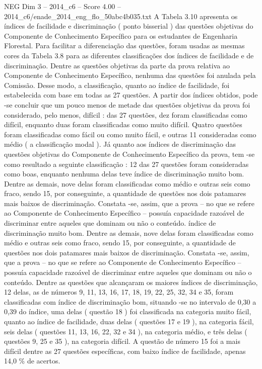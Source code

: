 \begin{textsample}{NEG Dim 3 – 2014\_c6 – Score 4.00 – 2014\_c6/enade\_2014\_eng\_flo\_50abc4b035.txt}
A Tabela 3.10 apresenta os índices de facilidade e discriminação ( ponto bisserial ) das questões objetivas do Componente de Conhecimento Específico para os estudantes de Engenharia Florestal.
Para facilitar a diferenciação das questões, foram usadas as mesmas cores da Tabela 3.8 para as diferentes classificações dos índices de facilidade e de discriminação.
Dentre as questões objetivas da parte da prova relativa ao Componente de Conhecimento Específico, nenhuma das questões foi anulada pela Comissão.
Desse modo, a classificação, quanto ao índice de facilidade, foi estabelecida com base em todas as 27 questões.
A partir dos índices obtidos, pode -se concluir que um pouco menos de metade das questões objetivas da prova foi considerado, pelo menos, difícil : das 27 questões, dez foram classificadas como difícil, enquanto duas foram classificadas como muito difícil.
Quatro questões foram classificadas como fácil ou como muito fácil, e outras 11 consideradas como médio ( a classificação modal ).
Já quanto aos índices de discriminação das questões objetivas do Componente de Conhecimento Específico da prova, tem -se como resultado a seguinte classificação : 12 das 27 questões foram consideradas como boas, enquanto nenhuma delas teve índice de discriminação muito bom.
Dentre as demais, nove delas foram classificadas como médio e outras seis como fraco, sendo 15, por conseguinte, a quantidade de questões nos dois patamares mais baixos de discriminação.
Constata -se, assim, que a prova – no que se refere ao Componente de Conhecimento Específico – possuía capacidade razoável de discriminar entre aqueles que dominam ou não o conteúdo. índice de discriminação muito bom.
Dentre as demais, nove delas foram classificadas como médio e outras seis como fraco, sendo 15, por conseguinte, a quantidade de questões nos dois patamares mais baixos de discriminação.
Constata -se, assim, que a prova – no que se refere ao Componente de Conhecimento Específico – possuía capacidade razoável de discriminar entre aqueles que dominam ou não o conteúdo.
Dentre as questões que alcançaram os maiores índices de discriminação, 12 delas, as de números 9, 11, 13, 16, 17, 18, 19, 22, 25, 32, 34 e 35, foram classificadas com índice de discriminação bom, situando -se no intervalo de 0,30 a 0,39 do índice, uma delas ( questão 18 ) foi classificada na categoria muito fácil, quanto ao índice de facilidade, duas delas ( questões 17 e 19 ), na categoria fácil, seis delas ( questões 11, 13, 16, 22, 32 e 34 ), na categoria médio, e três delas ( questões 9, 25 e 35 ), na categoria difícil.
A questão de número 15 foi a mais difícil dentre as 27 questões específicas, com baixo índice de facilidade, apenas 14,0 \% de acertos.

\end{textsample}
